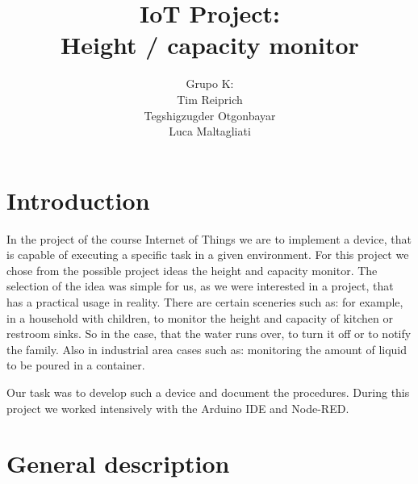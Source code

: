 \documentclass{article}
\title{IoT Project: \\Height / capacity monitor}
\author{Grupo K: \\ Tim Reiprich \\ Tegshigzugder Otgonbayar \\ Luca Maltagliati}
\begin{document}
\pagestyle{plain}  %

\maketitle


\newpage

\tableofcontents %
\newpage


\section{Introduction}

In the project of the course Internet of Things we are to implement a device, that is capable of executing a specific task in a given environment. For this project we chose from the possible project ideas the height and capacity monitor. The selection of the idea was simple for us, as we were interested in a project, that has a practical usage in reality. There are certain sceneries such as: for example, in a household with children, to monitor the height and capacity of kitchen or restroom sinks. So in the case, that the water runs over, to turn it off or to notify the family. Also in industrial area cases such as: monitoring the amount of liquid to be poured in a container.

Our task was to develop such a device and document the procedures. During this project we worked intensively with the Arduino IDE and Node-RED.

\section{General description}
\end{document}
